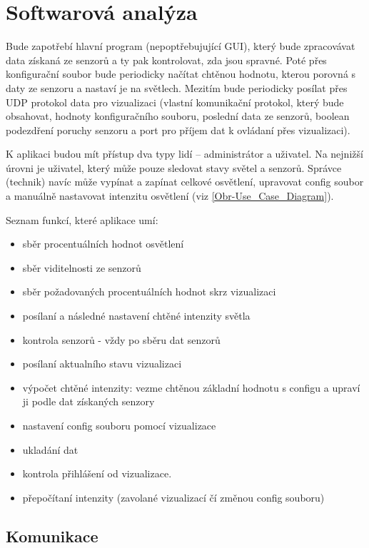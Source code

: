 \chapter{Softwarová analýza}

Bude zapotřebí hlavní program (nepoptřebujující GUI), který bude zpracovávat data získaná ze senzorů a ty pak kontrolovat, zda jsou spravné. Poté přes konfigurační soubor bude periodicky načítat chtěnou hodnotu, kterou porovná s daty ze senzoru a nastaví je na světlech. Mezitím bude periodicky posílat přes UDP protokol data pro vizualizaci (vlastní komunikační protokol, který bude obsahovat, hodnoty konfiguračního souboru, poslední data ze senzorů, boolean podezdření poruchy senzoru a port pro příjem dat k ovládaní přes vizualizaci).

K aplikaci budou mít přístup dva typy lidí -- administrátor a uživatel. Na nejnižší úrovni je uživatel, který může pouze sledovat stavy světel a senzorů. Správce (technik) navíc může vypínat a zapínat celkové osvětlení, upravovat config soubor a manuálně nastavovat intenzitu osvětlení (viz \autoref{Obr-Use_Case_Diagram}). 


Seznam funkcí, které aplikace umí:

\begin{itemize}
    \item sběr procentuálních hodnot osvětlení
    \item sběr viditelnosti ze senzorů
    \item sběr požadovaných procentuálních hodnot skrz vizualizaci
    \item posílaní a následné nastavení chtěné intenzity světla
    \item kontrola senzorů - vždy po sběru dat senzorů
    \item posílaní aktualního stavu vizualizaci
    \item výpočet chtěné intenzity: vezme chtěnou základní hodnotu s configu a upraví ji podle dat získaných senzory 
    \item nastavení config souboru pomocí vizualizace
    \item ukladání dat
    \item kontrola přihlášení od vizualizace.
    \item přepočítaní intenzity (zavolané vizualizací čí změnou config souboru)
\end{itemize}

\section{Komunikace}

